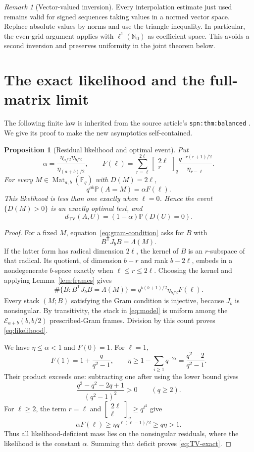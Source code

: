 \documentclass[11pt]{article}
\newtheorem{proposition}[theorem]{Proposition}
\theoremstyle{definition}
\theoremstyle{remark}
\newtheorem{remark}[theorem]{Remark}
\newcommand{\F}{\mathbb F}
\newcommand{\N}{\mathbb N}
\newcommand{\Pp}{\mathbb P}
\newcommand{\TV}{d_{\mathrm{TV}}}
\newcommand{\Mat}{\operatorname{Mat}}
\newcommand{\Emb}{\mathcal E}
\newcommand{\gb}[2]{\begin{bmatrix}#1\\#2\end{bmatrix}_{q}}
\newcommand{\tr}{\mathsf T}
\begin{document}
\begin{remark}[Vector-valued inversion]\label{rem:vector}
Every interpolation estimate just used remains valid for signed sequences taking values in a normed vector space. Replace absolute values by norms and use the triangle inequality. In particular, the even-grid argument applies with $\ell^1(\N_0)$ as coefficient space. This avoids a second inversion and preserves uniformity in the joint theorem below.
\end{remark}

\section{The exact likelihood and the full-matrix limit}\label{sec:likelihood}

The following finite law is inherited from the source article's \texttt{spn:thm:balanced} \cite{ProveIt}. We give its proof to make the new asymptotics self-contained.

\begin{proposition}[Residual likelihood and optimal event]\label{prop:likelihood}
Put
\[
 \alpha=\frac{\eta_{a/2}\eta_{b/2}}{\eta_{(a+b)/2}},\qquad
 F(\ell)=\sum_{r=\ell}^{2\ell}\gb{2\ell}{r}
           \frac{q^{-r(r+1)/2}}{\eta_{r-\ell}}.
\]
For every $M\in\Mat_{a,b}(\F_q)$ with $D(M)=2\ell$,
\begin{equation}\label{eq:likelihood}
 q^{ab}\Pp(A=M)=\alpha F(\ell).
\end{equation}
This likelihood is less than one exactly when $\ell=0$. Hence the event $\{D(M)>0\}$ is an exactly optimal test, and
\begin{equation}\label{eq:TV-exact}
 \TV(A,U)=(1-\alpha)\Pp(D(U)=0).
\end{equation}
\end{proposition}

\begin{proof}
For a fixed $M$, equation~\eqref{eq:gram-condition} asks for $B$ with
\[
 B^{\tr}J_bB=\Lambda(M).
\]
If the latter form has radical dimension $2\ell$, the kernel of $B$ is an $r$-subspace of that radical. Its quotient, of dimension $b-r$ and rank $b-2\ell$, embeds in a nondegenerate $b$-space exactly when $\ell\le r\le2\ell$. Choosing the kernel and applying Lemma~\ref{lem:frames} gives
\[
 \#\{B:B^{\tr}J_bB=\Lambda(M)\}
 =q^{b(b+1)/2}\eta_{b/2}F(\ell).
\]
Every stack $(M;B)$ satisfying the Gram condition is injective, because $J_b$ is nonsingular. By transitivity, the stack in \eqref{eq:model} is uniform among the $\Emb_{a+b}(b,b/2)$ prescribed-Gram frames. Division by this count proves \eqref{eq:likelihood}.

We have $\eta\le\alpha<1$ and $F(0)=1$. For $\ell=1$,
\[
 F(1)=1+\frac{q}{q^2-1},\qquad
 \eta\ge1-\sum_{i\ge1}q^{-2i}=\frac{q^2-2}{q^2-1}.
\]
Their product exceeds one: subtracting one after using the lower bound gives
\[
 \frac{q^3-q^2-2q+1}{(q^2-1)^2}>0\qquad(q\ge2).
\]
For $\ell\ge2$, the term $r=\ell$ and $\gb{2\ell}{\ell}\ge q^{\ell^2}$ give
\[
 \alpha F(\ell)\ge\eta q^{\ell(\ell-1)/2}\ge q\eta>1.
\]
Thus all likelihood-deficient mass lies on the nonsingular residuals, where the likelihood is the constant $\alpha$. Summing that deficit proves \eqref{eq:TV-exact}.
\end{proof}
\end{document}
